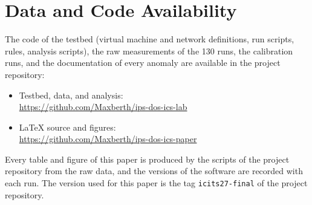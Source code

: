 \section*{Data and Code Availability}\label{sec:availability}
The code of the testbed (virtual machine and network definitions, run scripts, rules, analysis scripts), the raw measurements of the 130 runs, the calibration runs, and the documentation of every anomaly are available in the project repository:
\begin{itemize}
    \item Testbed, data, and analysis:\\{\footnotesize\url{https://github.com/Maxberth/ips-dos-ics-lab}}
    \item LaTeX source and figures:\\{\footnotesize\url{https://github.com/Maxberth/ips-dos-ics-paper}}
\end{itemize}
Every table and figure of this paper is produced by the scripts of the project repository from the raw data, and the versions of the software are recorded with each run. The version used for this paper is the tag \texttt{icits27-final} of the project repository.
